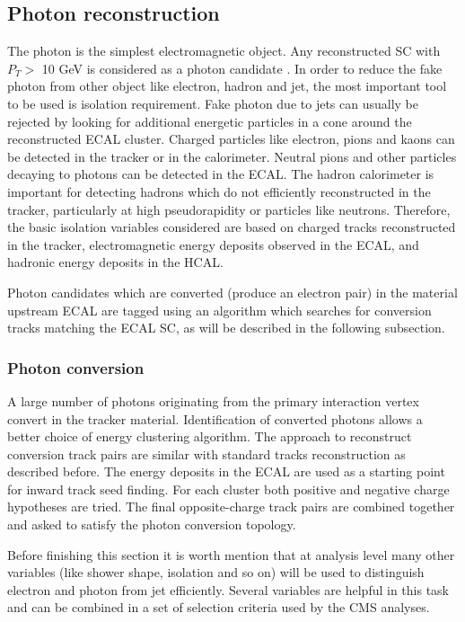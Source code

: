 \subsection{Photon reconstruction}\label{subsec:photon_reco}
The photon is the simplest electromagnetic object. Any reconstructed SC with $P_{T}>$ 10 GeV is considered as a photon candidate \cite{Soffi2016}. In order to reduce the fake photon from other object like electron, hadron and jet, the most important tool to be used is isolation requirement. Fake photon due to jets can usually be rejected by looking for additional energetic particles in a cone around the reconstructed ECAL cluster. Charged particles like electron, pions and kaons can be detected in the tracker or in the calorimeter. Neutral pions and other particles decaying to photons can be detected in the ECAL. The hadron calorimeter is important for detecting hadrons which do not efficiently reconstructed in the tracker, particularly at high pseudorapidity or particles like neutrons. Therefore, the basic isolation variables considered are based on charged tracks reconstructed in the tracker, electromagnetic energy deposits observed in the ECAL, and hadronic energy deposits
in the HCAL.

Photon candidates which are converted (produce an electron pair) in the material upstream ECAL are tagged using an algorithm which searches for conversion
tracks matching the ECAL SC, as will be described in the following subsection.
\subsubsection{Photon conversion}\label{subsec:photon_conversion}
A large number of photons originating from the primary interaction vertex convert in the tracker material. Identification of converted photons allows a better choice of energy clustering algorithm. The approach to reconstruct conversion track pairs are similar with standard tracks reconstruction as described before. The energy deposits in the ECAL are used as a starting point for inward track seed finding. For each cluster both positive and negative charge hypotheses are tried. The final opposite-charge track pairs are combined together and asked to satisfy the photon conversion topology.

Before finishing this section it is worth mention that at analysis level many other variables (like shower shape, isolation and so on) will be used to distinguish electron and photon from jet efficiently. Several variables are helpful in this task and can be combined in a set of selection criteria used by the CMS analyses.

